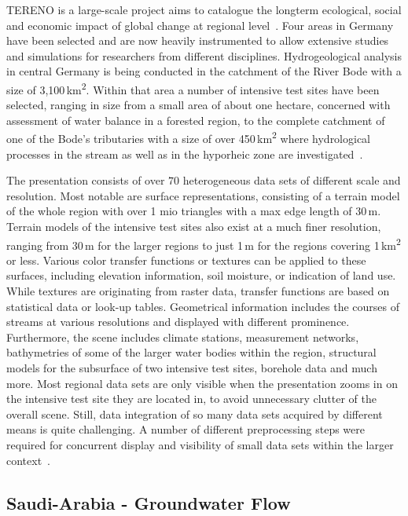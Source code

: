 \documentclass[twocolumn]{svjour3}          %
\begin{document}
TERENO is a large-scale project aims to catalogue the longterm ecological, social and economic impact of global change at regional level~\cite{zacharias:tereno}. Four areas in Germany have been selected and are now heavily instrumented to allow extensive studies and simulations for researchers from different disciplines. Hydrogeological analysis in central Germany is being conducted in the catchment of the River Bode with a size of 3,100\,km\textsuperscript{2}. Within that area a number of intensive test sites have been selected, ranging in size from a small area of about one hectare, concerned with assessment of water balance in a forested region, to the complete catchment of one of the Bode's tributaries with a size of over 450\,km\textsuperscript{2} where hydrological processes in the stream as well as in the hyporheic zone are investigated~\cite{schmidt:selke, trauth:flow}.

The presentation consists of over $70$ heterogeneous data sets of different scale and resolution. Most notable are surface representations, consisting of a terrain model of the whole region with over 1 mio triangles with a max edge length of 30\,m. Terrain models of the intensive test sites also exist at a much finer resolution, ranging from 30\,m for the larger regions to just 1\,m for the regions covering 1\,km\textsuperscript{2} or less. Various color transfer functions or textures can be applied to these surfaces, including elevation information, soil moisture, or indication of land use. While textures are originating from raster data, transfer functions are based on statistical data or look-up tables. Geometrical information includes the courses of streams at various resolutions and displayed with different prominence. Furthermore, the scene includes climate stations, measurement networks, bathymetries of some of the larger water bodies within the region, structural models for the subsurface of two intensive test sites, borehole data and much more. Most regional data sets are only visible when the presentation zooms in on the intensive test site they are located in, to avoid unnecessary clutter of the overall scene. Still, data integration of so many data sets acquired by different means is quite challenging. A number of different preprocessing steps were required for concurrent display and visibility of small data sets within the larger context~\cite{rink:wessti, rink:eesenvirvis}.

\subsection{Saudi-Arabia - Groundwater
Flow}\label{saudi-arabia---groundwater-flow}
\end{document}
